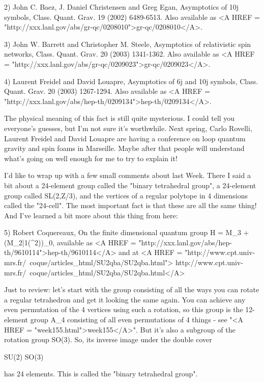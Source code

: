 2) John C. Baez, J. Daniel Christensen and Greg Egan,
Asymptotics of 10j symbols, Class. Quant. Grav. 19 (2002) 6489-6513.  
Also available as <A HREF = "http://xxx.lanl.gov/abs/gr-qc/0208010">gr-qc/0208010</A>.

3) John W. Barrett and Christopher M. Steele, Asymptotics of 
relativistic spin networks, Class. Quant. Grav. 20 (2003) 1341-1362.
Also available as <A HREF = "http://xxx.lanl.gov/abs/gr-qc/0209023">gr-qc/0209023</A>.

4) Laurent Freidel and David Louapre, Asymptotics of 6j and 10j 
symbols, Class. Quant. Grav. 20 (2003) 1267-1294.  Also available as 
<A HREF = "http://xxx.lanl.gov/abs/hep-th/0209134">hep-th/0209134</A>.

The physical meaning of this fact is still quite mysterious.  I could 
tell you everyone's guesses, but I'm not sure it's worthwhile.  Next
spring, Carlo Rovelli, Laurent Freidel and David Louapre are having 
a conference on loop quantum gravity and spin foams in Marseille.  
Maybe after that people will understand what's going on well enough
for me to try to explain it!

I'd like to wrap up with a few small comments about last Week.
There I said a bit about a 24-element group called the "binary 
tetrahedral group", a 24-element group called SL(2,Z/3), and 
the vertices of a regular polytope in 4 dimensions called the 
"24-cell".  The most important fact is that these are all the 
same thing!  And I've learned a bit more about this thing from here:
 
5) Robert Coquereaux, On the finite dimensional quantum group
H = M_{3} + (M_{2|1}(\Lambda ^{2}))_{0}, 
available as <A HREF = "http://xxx.lanl.gov/abs/hep-th/9610114">hep-th/9610114</A> and at 
<A HREF = "http://www.cpt.univ-mrs.fr/~coque/articles_html/SU2qba/SU2qba.html"> http://www.cpt.univ-mrs.fr/~coque/articles_html/SU2qba/SU2qba.html</A>

Just to review: let's start with the group consisting of all the 
ways you can rotate a regular tetrahedron and get it looking the 
same again.  You can achieve any even permutation of the 4 vertices 
using such a rotation, so this group is the 12-element group A_{4} 
consisting of all even permutations of 4 things - see "<A HREF = "week155.html">week155</A>".  
But it's also a subgroup of the rotation group SO(3).   So,
its inverse image under the double cover

SU(2) \to  SO(3)

has 24 elements.  This is called the "binary tetrahedral group".

